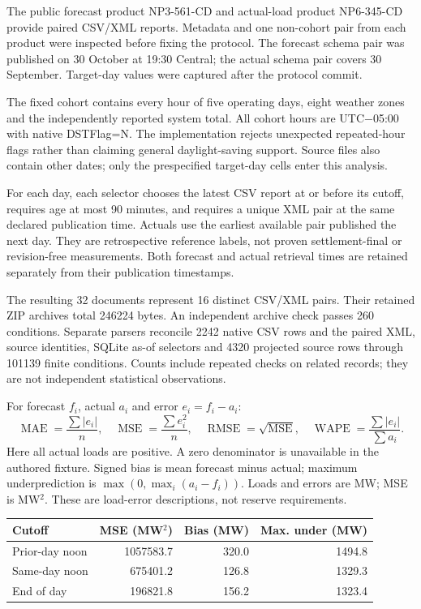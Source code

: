 \documentclass[10pt,letterpaper]{article}
\newcommand{\AheadMse}{1057583.7}
\newcommand{\AheadBias}{320.0}
\newcommand{\AheadUnder}{1494.8}
\newcommand{\NoonMse}{675401.2}
\newcommand{\NoonBias}{126.8}
\newcommand{\NoonUnder}{1329.3}
\newcommand{\EndMse}{196821.8}
\newcommand{\EndBias}{156.2}
\newcommand{\EndUnder}{1323.4}
\newcommand{\NativeChecks}{101139}
\newcommand{\NativeRows}{2242}
\newcommand{\ProjectedRows}{4320}
\begin{document}
The public forecast product NP3-561-CD and actual-load product NP6-345-CD provide paired CSV/XML reports. Metadata and one non-cohort pair from each product were inspected before fixing the protocol. The forecast schema pair was published on 30 October at 19:30 Central; the actual schema pair covers 30 September. Target-day values were captured after the protocol commit.

The fixed cohort contains every hour of five operating days, eight weather zones and the independently reported system total. All cohort hours are UTC$-$05:00 with native DSTFlag=N. The implementation rejects unexpected repeated-hour flags rather than claiming general daylight-saving support. Source files also contain other dates; only the prespecified target-day cells enter this analysis.

For each day, each selector chooses the latest CSV report at or before its cutoff, requires age at most 90 minutes, and requires a unique XML pair at the same declared publication time. Actuals use the earliest available pair published the next day. They are retrospective reference labels, not proven settlement-final or revision-free measurements. Both forecast and actual retrieval times are retained separately from their publication timestamps.

The resulting 32 documents represent 16 distinct CSV/XML pairs. Their retained ZIP archives total 246224 bytes. An independent archive check passes 260 conditions. Separate parsers reconcile \NativeRows{} native CSV rows and the paired XML, source identities, SQLite as-of selectors and \ProjectedRows{} projected source rows through \NativeChecks{} finite conditions. Counts include repeated checks on related records; they are not independent statistical observations.

For forecast $f_i$, actual $a_i$ and error $e_i=f_i-a_i$:
\[
 \operatorname{MAE}=\frac{\sum |e_i|}{n},\quad
 \operatorname{MSE}=\frac{\sum e_i^2}{n},\quad
 \operatorname{RMSE}=\sqrt{\operatorname{MSE}},\quad
 \operatorname{WAPE}=\frac{\sum|e_i|}{\sum a_i}.
\]
Here all actual loads are positive. A zero denominator is unavailable in the authored fixture. Signed bias is mean forecast minus actual; maximum underprediction is $\max(0,\max_i(a_i-f_i))$. Loads and errors are MW; MSE is MW$^2$. These are load-error descriptions, not reserve requirements.

\begin{center}
\begin{tabular}{lrrr}\toprule
Cutoff & MSE (MW$^2$) & Bias (MW) & Max. under (MW)\\\midrule
Prior-day noon & \AheadMse & \AheadBias & \AheadUnder\\
Same-day noon & \NoonMse & \NoonBias & \NoonUnder\\
End of day & \EndMse & \EndBias & \EndUnder\\\bottomrule
\end{tabular}
\end{center}
\end{document}
